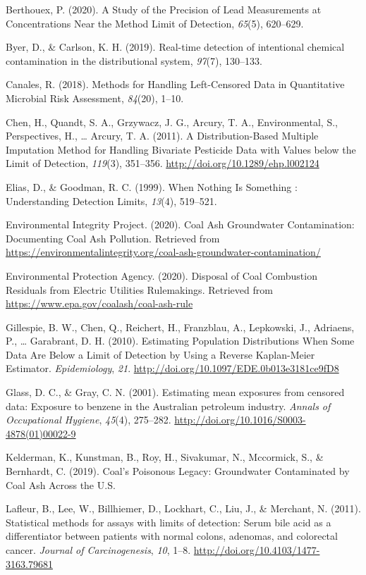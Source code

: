 \documentclass[12pt, twoside]{amherstthesis}
\newlength{\cslhangindent}
\newenvironment{cslreferences}%
  {\setlength{\parindent}{0pt}%
  \everypar{\setlength{\hangindent}{\cslhangindent}}\ignorespaces}%
  {\par}
\begin{document}
\hypertarget{refs}{}
\begin{cslreferences}
\leavevmode\hypertarget{ref-Berthouex2020}{}%
Berthouex, P. (2020). A Study of the Precision of Lead Measurements at Concentrations Near the Method Limit of Detection, \emph{65}(5), 620--629.

\leavevmode\hypertarget{ref-Byer2019}{}%
Byer, D., \& Carlson, K. H. (2019). Real-time detection of intentional chemical contamination in the distributional system, \emph{97}(7), 130--133.

\leavevmode\hypertarget{ref-Canales2018}{}%
Canales, R. (2018). Methods for Handling Left-Censored Data in Quantitative Microbial Risk Assessment, \emph{84}(20), 1--10.

\leavevmode\hypertarget{ref-Chen2011}{}%
Chen, H., Quandt, S. A., Grzywacz, J. G., Arcury, T. A., Environmental, S., Perspectives, H., \ldots{} Arcury, T. A. (2011). A Distribution-Based Multiple Imputation Method for Handling Bivariate Pesticide Data with Values below the Limit of Detection, \emph{119}(3), 351--356. \url{http://doi.org/10.1289/ehp.l002124}

\leavevmode\hypertarget{ref-Elias1999}{}%
Elias, D., \& Goodman, R. C. (1999). When Nothing Is Something : Understanding Detection Limits, \emph{13}(4), 519--521.

\leavevmode\hypertarget{ref-EIP2020}{}%
Environmental Integrity Project. (2020). Coal Ash Groundwater Contamination: Documenting Coal Ash Pollution. Retrieved from \url{https://environmentalintegrity.org/coal-ash-groundwater-contamination/}

\leavevmode\hypertarget{ref-Car2020}{}%
Environmental Protection Agency. (2020). Disposal of Coal Combustion Residuals from Electric Utilities Rulemakings. Retrieved from \url{https://www.epa.gov/coalash/coal-ash-rule}

\leavevmode\hypertarget{ref-Gillespie2010}{}%
Gillespie, B. W., Chen, Q., Reichert, H., Franzblau, A., Lepkowski, J., Adriaens, P., \ldots{} Garabrant, D. H. (2010). Estimating Population Distributions When Some Data Are Below a Limit of Detection by Using a Reverse Kaplan-Meier Estimator. \emph{Epidemiology}, \emph{21}. \url{http://doi.org/10.1097/EDE.0b013e3181ce9fD8}

\leavevmode\hypertarget{ref-Glass2001}{}%
Glass, D. C., \& Gray, C. N. (2001). Estimating mean exposures from censored data: Exposure to benzene in the Australian petroleum industry. \emph{Annals of Occupational Hygiene}, \emph{45}(4), 275--282. \url{http://doi.org/10.1016/S0003-4878(01)00022-9}

\leavevmode\hypertarget{ref-Kelderman2019}{}%
Kelderman, K., Kunstman, B., Roy, H., Sivakumar, N., Mccormick, S., \& Bernhardt, C. (2019). Coal's Poisonous Legacy: Groundwater Contaminated by Coal Ash Across the U.S.

\leavevmode\hypertarget{ref-Lafleur2011}{}%
Lafleur, B., Lee, W., Billhiemer, D., Lockhart, C., Liu, J., \& Merchant, N. (2011). Statistical methods for assays with limits of detection: Serum bile acid as a differentiator between patients with normal colons, adenomas, and colorectal cancer. \emph{Journal of Carcinogenesis}, \emph{10}, 1--8. \url{http://doi.org/10.4103/1477-3163.79681}
\end{cslreferences}
\end{document}
